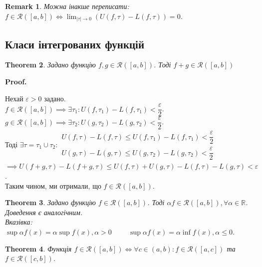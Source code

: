 \documentclass[a4paper, 10pt]{article}
\makeatletter
\def\huge{\displaystyle}
\def\qed{$\blacksquare$}
\theoremstyle{theoremdd}
\newtheorem{theorem}{Theorem}[subsection]
\theoremstyle{theoremdd}
\theoremstyle{theoremdd}
\theoremstyle{theoremdd}
\theoremstyle{theoremdd}
\theoremstyle{theoremdd}
\theoremstyle{theoremdd}
\newtheorem{remark}[theorem]{Remark}
\theoremstyle{theoremdd}
\theoremstyle{theoremdd}
\renewenvironment{proof}[1][Proof.\\]{\par
\pushQED{\hfill \qed}%
\normalfont \topsep6\p@\@plus6\p@\relax
\trivlist
\item\relax
{\bfseries
#1\@addpunct{.}}\hspace\labelsep\ignorespaces
}{%
\popQED\endtrivlist\@endpefalse
}
\makeatother
\begin{document}
\begin{remark}
Можна інакше переписати: $f \in \mathcal{R}([a,b]) \iff \huge\lim_{|\tau| \to 0} (U(f,\tau) - L(f,\tau)) = 0$.
\end{remark}

\subsection{Класи інтегрованих функцій}
\begin{theorem}
Задано функцію $f,g \in \mathcal{R}([a,b])$. Тоді $f+g \in \mathcal{R}([a,b])$
\end{theorem}

\begin{proof}
Нехай $\varepsilon > 0$ задано.\\
$f \in \mathcal{R}([a,b]) \implies \exists \tau_1: U(f,\tau_1) - L(f,\tau_1) < \dfrac{\varepsilon}{2}$.\\
$g \in \mathcal{R}([a,b]) \implies \exists \tau_2: U(g,\tau_2) - L(g,\tau_2) < \dfrac{\varepsilon}{2}$.\\
Тоді $\exists \tau = \tau_1 \cup \tau_2: \begin{gathered} U(f,\tau)-L(f,\tau) \leq U(f,\tau_1)-L(f,\tau_1) < \dfrac{\varepsilon}{2} \\
U(g,\tau)-L(g,\tau) \leq U(g,\tau_2) - L(g,\tau_2) < \dfrac{\varepsilon}{2} \end{gathered}$\\
$\implies U(f+g,\tau) - L(f+g,\tau) \leq U(f,\tau) + U(g,\tau) - L(f,\tau) - L(g,\tau) < \varepsilon$.\\
Таким чином, ми отримали, що $f \in \mathcal{R}([a,b])$.
\end{proof}

\begin{theorem}
Задано функцію $f \in \mathcal{R}([a,b])$. Тоді $\alpha f \in \mathcal{R}([a,b]), \forall \alpha \in \mathbb{R}$.\\
\textit{Доведення є аналогічним.}\\
\textit{Вказівка: $\huge\sup \alpha f(x) = \alpha \sup f(x), \alpha > 0 \hspace{1cm} \sup \alpha f(x) = \alpha \inf f(x), \alpha \leq 0$}.
\end{theorem}

\begin{theorem}
Функція $f \in \mathcal{R}([a,b]) \iff \forall c \in (a,b): f \in \mathcal{R}([a,c])$ та $f \in \mathcal{R}([c,b])$.
\end{theorem}
\end{document}
